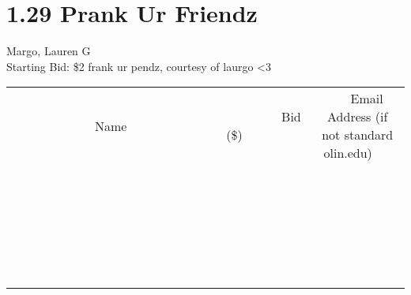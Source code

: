 \documentclass[11pt]{article}
\begin{document}
\section*{1.29 Prank Ur Friendz}
Margo, Lauren G
\\
Starting Bid: \$2
\newline
frank ur pendz, courtesy of laurgo \textless 3
\\[6ex]
\begin{tabular}{c c c}
~~~~~~~~~~~~~Name~~~~~~~~~~~~~ & ~~~~~~~~~Bid (\$)~~~~~~~~~  & ~~~Email Address (if not standard olin.edu)~~~\\
 & & \\
\hline
 & & \\
\hline
 & & \\
\hline
 & & \\
\hline
 & & \\
\hline
 & & \\
\hline
 & & \\
\hline
 & & \\
\hline
 & & \\
\hline
 & & \\
\hline
 & & \\
\hline
 & & \\
\hline
 & & \\
\hline
 & & \\
\hline
 & & \\
\hline
 & & \\
\hline
 & & \\
\hline
 & & \\
\hline
 & & \\
\hline
 & & \\
\hline
 & & \\
\hline
 & & \\
\hline
 & & \\
\hline
 & & \\
\hline
 & & \\
\hline
 & & \\
\hline
\end{tabular}
\newpage
\end{document}
